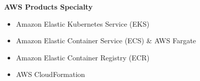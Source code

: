 \textbf{AWS Products Specialty}
\begin{multicols}{2}
    \begin{itemize}
        \item Amazon Elastic Kubernetes Service (EKS)

        \item Amazon Elastic Container Service (ECS) \& AWS Fargate

        \item Amazon Elastic Container Registry (ECR)

        \item AWS CloudFormation
    \end{itemize}
\end{multicols}
